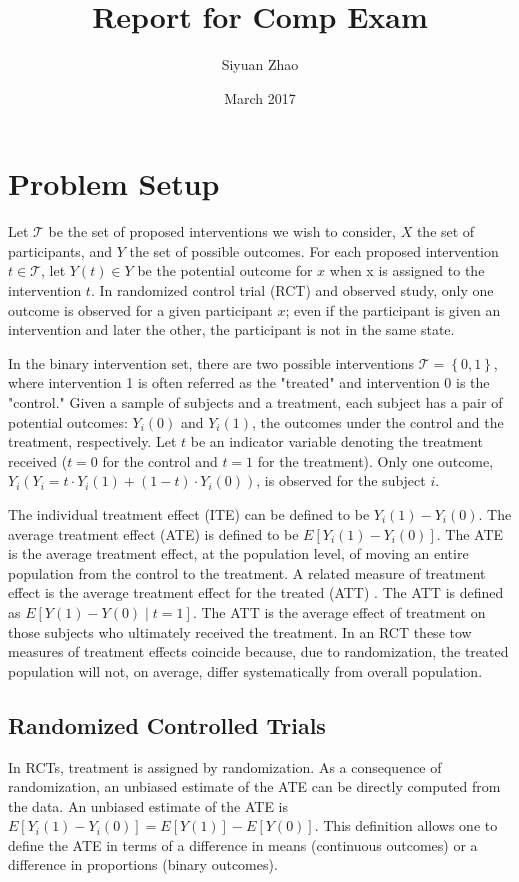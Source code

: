 \documentclass{article}
\title{Report for Comp Exam}
\author{Siyuan Zhao}
\date{March 2017}
\begin{document}
\maketitle

\section{Problem Setup}
Let $\mathcal{T}$ be the set of proposed interventions we wish to
consider, $X$ the set of participants, and $Y$ the set of possible
outcomes. For each proposed intervention $t \in \mathcal{T}$, let
$Y(t) \in Y$ be the potential outcome for $x$ when x is assigned to
the intervention $t$. In randomized control trial (RCT) and observed
study, only one outcome is observed for a given participant $x$; even
if the participant is given an intervention and later the other, the
participant is not in the same state.

In the binary intervention set, there are two possible interventions
$\mathcal{T} = \left \{  0, 1 \right \}$, where intervention 1 is
often referred as the "treated" and intervention 0 is the "control."
Given a sample of subjects and a treatment, each subject has a pair of
potential outcomes: $Y_i(0)$ and $Y_i(1)$, the outcomes under the
control and the treatment, respectively. Let $t$ be an indicator
variable denoting the treatment received ($t = 0$ for the control and
$t=1$ for the treatment). Only one outcome, $Y_i (Y_i=t\cdot Y_i(1) +
(1-t) \cdot Y_i(0))$, is observed for the
subject $i$.

The individual treatment effect (ITE) can be defined to
be $Y_i(1) - Y_i(0)$. The average treatment effect (ATE) is defined to
be $E[Y_i(1) - Y_i(0)]$. The ATE is the average treatment effect, at
the population level, of moving an entire population from the control
to the treatment. A related measure of treatment effect is the average
treatment effect for the treated (ATT) \cite{imbens2004}. The ATT is
defined as $E[Y(1)-Y(0) \mid t=1]$. The ATT is the average effect of
treatment on those subjects who ultimately received the treatment. In
an RCT these tow measures of treatment effects coincide because, due
to randomization, the treated population will not, on average, differ
systematically from overall population.

\subsection{Randomized Controlled Trials}
In RCTs, treatment is assigned by randomization. As a consequence of
randomization, an unbiased estimate of the ATE can be directly
computed from the data. An unbiased estimate of the ATE is
$E[Y_i(1)-Y_i(0)]=E[Y(1)] - E[Y(0)]$. This definition allows one to
define the ATE in terms of a difference in means (continuous outcomes)
or a difference in proportions (binary outcomes).
\end{document}
